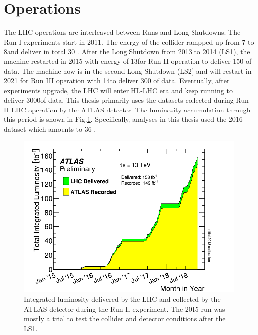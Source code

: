 \section{Operations}

The LHC operations are interleaved between Runs and Long Shutdowns. The Run I experiments start in 2011. The energy of the collider rampped up from 7 to 8\tev and deliver in total 30 \ifb. After the Long Shutdown from 2013 to 2014 (LS1), the machine restarted in 2015 with energy of 13\tev for Run II operation to deliver 150 \ifb of data. The machine now is in the second Long Shutdown (LS2) and will restart in 2021 for Run III operation with 14\tev to deliver 300 \ifb of data. Eventually, after experiments upgrade, the LHC will enter HL-LHC era and keep running to deliver 3000\ifb of data. This thesis primarily uses the datasets collected during Run II LHC operation by the ATLAS detector. The luminosity accumulation through this period is shown in Fig.\ref{fig:lhc-lumi}. Specifically, analyses in this thesis used the 2016 dataset which amounts to 36 \ifb.


\begin{figure}[htpb!]
\begin{center}
  \includegraphics[width=0.6\linewidth]{figures/LHC/intlumivstimeRun2.png}
\caption{Integrated luminosity delivered by the LHC and collected by the ATLAS detector during the Run II experiment. The 2015 run was mostly a trial to test the collider and detector conditions after the LS1.}
\label{fig:lhc-lumi}
\end{center}
\end{figure}
